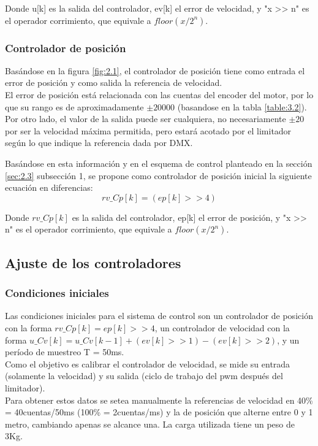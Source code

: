 Donde u[k] es la salida del controlador, ev[k] el error de velocidad, y "x >> n" es el operador corrimiento, que equivale a \(floor(x/2^n)\).

\subsubsection{Controlador de posición}
Basándose en la figura \ref{fig:2.1}, el controlador de posición tiene como entrada el error de posición y como salida la referencia de velocidad. \\
El error de posición está relacionada con las cuentas del encoder del motor, por lo que su rango es de aproximadamente \(\pm 20000\) (basandose en la tabla \ref{table:3.2}). Por otro lado, el valor de la salida puede ser cualquiera, no necesariamente \(\pm 20\) por ser la velocidad máxima permitida, pero estará acotado por el limitador según lo que indique la referencia dada por DMX.

Basándose en esta información y en el esquema de control planteado en la sección \ref{sec:2.3} subsección 1, se propone como controlador de posición inicial la siguiente ecuación en diferencias:
\[rv\_Cp[k] = (ep[k] >> 4)\]

Donde \(rv\_Cp[k]\) es la salida del controlador, ep[k] el error de posición, y "x >> n" es el operador corrimiento, que equivale a \(floor(x/2^n)\).

\subsection{Ajuste de los controladores}


\subsubsection{Condiciones iniciales}
Las condiciones iniciales para el sistema de control son un controlador de posición con la forma \(rv\_Cp[k] = ep[k] >> 4\), un controlador de velocidad con la forma \(u\_Cv[k] = u\_Cv[k-1] + (ev[k] >> 1) - (ev[k] >> 2)\), y un período de muestreo T = 50ms.\\

Como el objetivo es calibrar el controlador de velocidad, se mide su entrada (solamente la velocidad) y su salida (ciclo de trabajo del pwm después del limitador). \\
Para obtener estos datos se setea manualmente la referencias de velocidad en 40\% = 40cuentas/50ms (100\% = 2cuentas/ms) y la de posición que alterne entre 0 y 1 metro, cambiando apenas se alcance una. La carga utilizada tiene un peso de 3Kg.

